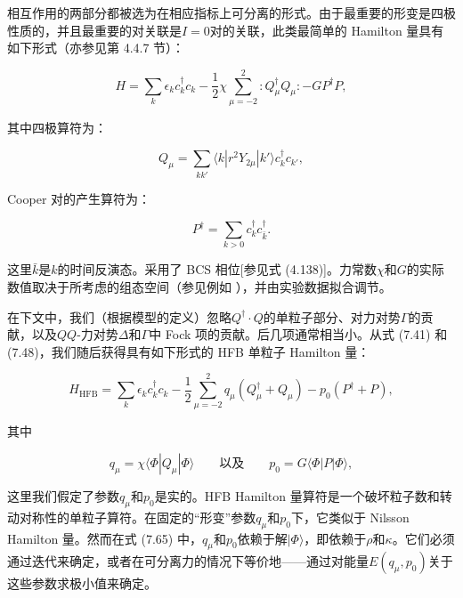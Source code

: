 相互作用的两部分都被选为在相应指标上可分离的形式。由于最重要的形变是四极性质的，并且最重要的对关联是$I=0$对的关联，此类最简单的
Hamilton 量具有如下形式（亦参见第 4.4.7 节）：

\begin{equation}
H=\sum_{k}\epsilon_{k}c^{\dagger}_{k}c_{k}-\frac{1}{2}\chi\sum^{2}_{\mu=-2}:Q^{\dagger}_{\mu}Q_{\mu}:-GP^{\dagger}P,\label{eq:hamiltonian_ppq}
\end{equation}

其中四极算符为：

\begin{equation}
Q_{\mu}=\sum_{kk'}\langle k|r^{2}Y_{2\mu}|k'\rangle c^{\dagger}_{k}c_{k'},\label{eq:quadrupole_operator_ppq}
\end{equation}

Cooper 对的产生算符为：

\begin{equation}
P^{\dagger}=\sum_{k>0}c^{\dagger}_{k}c^{\dagger}_{\bar{k}}.\label{eq:cooper_pair_creation_ppq}
\end{equation}

这里$\bar{k}$是$k$的时间反演态。采用了 BCS 相位{[}参见式 (4.138){]}。力常数$\chi$和$G$的实际数值取决于所考虑的组态空间（参见例如
\cite{BK68}），并由实验数据拟合调节。

在下文中，我们（根据模型的定义）忽略$Q^{\dagger}\cdot Q$的单粒子部分、对力对势$\Gamma$的贡献，以及$QQ$-力对势$\Delta$和$\Gamma$中
Fock 项的贡献。后几项通常相当小。从式 (7.41) 和 (7.48)，我们随后获得具有如下形式的 HFB 单粒子 Hamilton
量：

\begin{equation}
H_{\text{HFB}}=\sum_{k}\epsilon_{k}c^{\dagger}_{k}c_{k}-\frac{1}{2}\sum^{2}_{\mu=-2}q_{\mu}(Q^{\dagger}_{\mu}+Q_{\mu})-p_{0}(P^{\dagger}+P),\label{eq:hfb_hamiltonian_ppq}
\end{equation}

其中

\begin{equation}
q_{\mu}=\chi\langle\Phi|Q_{\mu}|\Phi\rangle\qquad\text{以及}\qquad p_{0}=G\langle\Phi|P|\Phi\rangle,\label{eq:q_mu_p0_def}
\end{equation}

这里我们假定了参数$q_{\mu}$和$p_{0}$是实的。HFB Hamilton 量算符是一个破坏粒子数和转动对称性的单粒子算符。在固定的“形变”参数$q_{\mu}$和$p_{0}$下，它类似于
Nilsson Hamilton 量。然而在式 (7.65) 中，$q_{\mu}$和$p_{0}$依赖于解$|\Phi\rangle$，即依赖于$\rho$和$\kappa$。它们必须通过迭代来确定，或者在可分离力的情况下等价地——通过对能量$E(q_{\mu},p_{0})$关于这些参数求极小值来确定。

